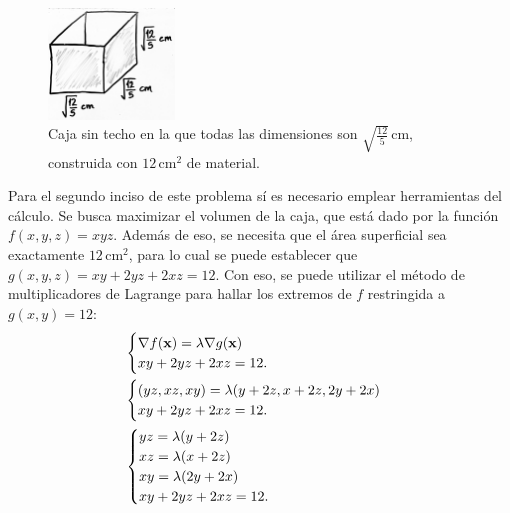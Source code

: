 \documentclass{fmbvecto}
\begin{document}
\begin{problema}
\begin{gbox}
    \begin{figure}[H]
        \centering
        \includegraphics[width=0.3\textwidth]{caja12.png}
        \caption{Caja sin techo en la que todas las dimensiones son \(\sqrt{\frac{12}{5}} \, \mathrm{cm}\), construida con \(12 \, \mathrm{cm}^2 \) de material.}
    \end{figure}
\end{gbox}

Para el segundo inciso de este problema sí es necesario emplear herramientas del cálculo. Se busca maximizar el volumen de la caja, que está dado por la función \(f(x, y, z)=xyz\). Además de eso, se necesita que el área superficial sea exactamente \(12 \, \mathrm{cm}^2 \), para lo cual se puede establecer que \(g(x, y, z)=xy + 2yz + 2xz = 12\). Con eso, se puede utilizar el método de multiplicadores de Lagrange para hallar los extremos de \(f\) restringida a \(g(x, y) = 12\):
\begin{align*}
    &\begin{cases}
        \nabla f(\boldsymbol{{\mathbf{x}}}) = \lambda \nabla g(\boldsymbol{{\mathbf{x}}}) \\
        xy + 2yz + 2xz = 12.
    \end{cases} \\
    &\begin{cases}
        (yz, xz, xy) = \lambda (y + 2z, x + 2z, 2y + 2x) \\
        xy + 2yz + 2xz = 12.
    \end{cases} \\
    &\begin{cases}
        yz = \lambda(y + 2z) \\
        xz = \lambda(x + 2z) \\
        xy = \lambda(2y + 2x) \\
        xy + 2yz + 2xz = 12.
    \end{cases}
\end{align*}


\end{problema}
\end{document}
